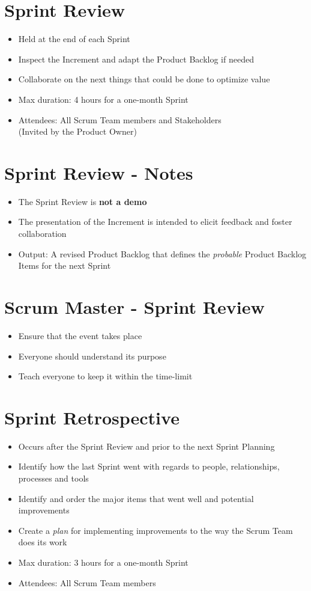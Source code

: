 \documentclass[a4paper,11pt,twocolumn]{article}
\begin{document}
\section*{Sprint Review}
\begin{itemize}
	\item Held at the end of each Sprint
	\item Inspect the Increment and adapt the Product Backlog if needed
	\item Collaborate on the next things that could be done to optimize value
	\item Max duration: 4 hours for a one-month Sprint
	\item Attendees: All Scrum Team members and Stakeholders\\
	(Invited by the Product Owner)
\end{itemize}

\section*{Sprint Review - Notes}
\begin{itemize}
	\item The Sprint Review is \textbf{not a demo}
	\item The presentation of the Increment is intended to elicit feedback and foster collaboration
	\item Output: A revised Product Backlog that defines the \textit{probable} Product Backlog Items for the next Sprint
\end{itemize}

\section*{Scrum Master - Sprint Review}
\begin{itemize}
	\item Ensure that the event takes place
	\item Everyone should understand its purpose
	\item Teach everyone to keep it within the time-limit
\end{itemize}

\section*{Sprint Retrospective}
\begin{itemize}
	\item Occurs after the Sprint Review and prior to the next Sprint Planning
	\item Identify how the last Sprint went with regards to people, relationships, processes and tools
	\item Identify and order the major items that went well and potential improvements
	\item Create a \textit{plan} for implementing improvements to the way the Scrum Team does its work
	\item Max duration: 3 hours for a one-month Sprint
	\item Attendees: All Scrum Team members
\end{itemize}
\end{document}
